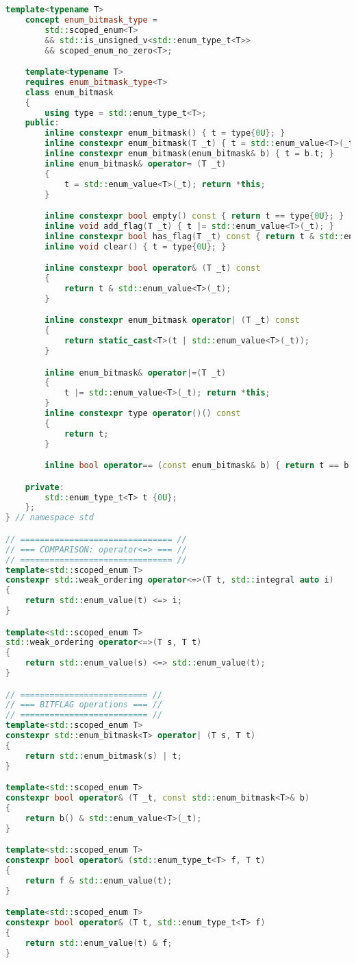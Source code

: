 \documentclass[
  format=manuscript,
  screen=true,
  review=false,
  nonacm=true,
  timestamp=true,
  balance=false]{acmart}
\begin{document}
\begin{lstlisting}[language=Cpp]
    template<typename T>
    concept enum_bitmask_type =
        std::scoped_enum<T>
        && std::is_unsigned_v<std::enum_type_t<T>>
        && scoped_enum_no_zero<T>;

    template<typename T>
    requires enum_bitmask_type<T>
    class enum_bitmask
    {
        using type = std::enum_type_t<T>;
    public:
        inline constexpr enum_bitmask() { t = type{0U}; }
        inline constexpr enum_bitmask(T _t) { t = std::enum_value<T>(_t); }
        inline constexpr enum_bitmask(enum_bitmask& b) { t = b.t; }
        inline enum_bitmask& operator= (T _t)
        {
            t = std::enum_value<T>(_t); return *this;
        }

        inline constexpr bool empty() const { return t == type{0U}; }
        inline void add_flag(T _t) { t |= std::enum_value<T>(_t); }
        inline constexpr bool has_flag(T _t) const { return t & std::enum_value<T>(_t); }
        inline void clear() { t = type{0U}; }

        inline constexpr bool operator& (T _t) const
        {
            return t & std::enum_value<T>(_t);
        }

        inline constexpr enum_bitmask operator| (T _t) const
        {
            return static_cast<T>(t | std::enum_value<T>(_t));
        }

        inline enum_bitmask& operator|=(T _t)
        {
            t |= std::enum_value<T>(_t); return *this;
        }
        inline constexpr type operator()() const
        {
            return t;
        }

        inline bool operator== (const enum_bitmask& b) { return t == b.t; }

    private:
        std::enum_type_t<T> t {0U};
    };
} // namespace std

// =============================== //
// === COMPARISON: operator<=> === //
// =============================== //
template<std::scoped_enum T>
constexpr std::weak_ordering operator<=>(T t, std::integral auto i)
{
    return std::enum_value(t) <=> i;
}

template<std::scoped_enum T>
std::weak_ordering operator<=>(T s, T t)
{
    return std::enum_value(s) <=> std::enum_value(t);
}

// ========================== //
// === BITFLAG operations === //
// ========================== //
template<std::scoped_enum T>
constexpr std::enum_bitmask<T> operator| (T s, T t)
{
    return std::enum_bitmask(s) | t;
}

template<std::scoped_enum T>
constexpr bool operator& (T _t, const std::enum_bitmask<T>& b)
{
    return b() & std::enum_value<T>(_t);
}

template<std::scoped_enum T>
constexpr bool operator& (std::enum_type_t<T> f, T t)
{
    return f & std::enum_value(t);
}

template<std::scoped_enum T>
constexpr bool operator& (T t, std::enum_type_t<T> f)
{
    return std::enum_value(t) & f;
}

\end{lstlisting}
\end{document}
